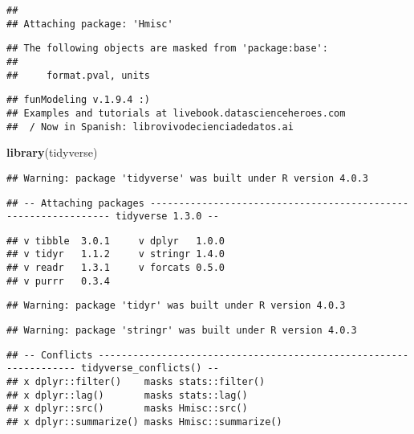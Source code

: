 \documentclass[
]{article}
\newenvironment{Shaded}{\begin{snugshade}}{\end{snugshade}}
\newcommand{\KeywordTok}[1]{\textcolor[rgb]{0.13,0.29,0.53}{\textbf{#1}}}
\newcommand{\NormalTok}[1]{#1}
\begin{document}
\begin{verbatim}
## 
## Attaching package: 'Hmisc'
\end{verbatim}

\begin{verbatim}
## The following objects are masked from 'package:base':
## 
##     format.pval, units
\end{verbatim}

\begin{verbatim}
## funModeling v.1.9.4 :)
## Examples and tutorials at livebook.datascienceheroes.com
##  / Now in Spanish: librovivodecienciadedatos.ai
\end{verbatim}

\begin{Shaded}
\begin{Highlighting}[]
\KeywordTok{library}\NormalTok{(tidyverse) }
\end{Highlighting}
\end{Shaded}

\begin{verbatim}
## Warning: package 'tidyverse' was built under R version 4.0.3
\end{verbatim}

\begin{verbatim}
## -- Attaching packages --------------------------------------------------------------- tidyverse 1.3.0 --
\end{verbatim}

\begin{verbatim}
## v tibble  3.0.1     v dplyr   1.0.0
## v tidyr   1.1.2     v stringr 1.4.0
## v readr   1.3.1     v forcats 0.5.0
## v purrr   0.3.4
\end{verbatim}

\begin{verbatim}
## Warning: package 'tidyr' was built under R version 4.0.3
\end{verbatim}

\begin{verbatim}
## Warning: package 'stringr' was built under R version 4.0.3
\end{verbatim}

\begin{verbatim}
## -- Conflicts ------------------------------------------------------------------ tidyverse_conflicts() --
## x dplyr::filter()    masks stats::filter()
## x dplyr::lag()       masks stats::lag()
## x dplyr::src()       masks Hmisc::src()
## x dplyr::summarize() masks Hmisc::summarize()
\end{verbatim}
\end{document}
